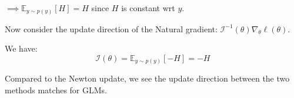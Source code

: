 \begin{solution}
\begin{itemize}
              $\implies \mathbb{E}_{y \sim p(y)}[H] = H$ since $H$ is constant wrt $y$.

              Now consider the update direction of the Natural gradient: $\mathcal{I}^{-1}(\theta) \nabla_\theta \ell(\theta)$.

              We have:
              \[
                  \mathcal{I}(\theta) = \mathbb{E}_{y \sim p(y)}[-H] = -H
              \]

              Compared to the Newton update, we see the update direction between the two methods matches for GLMs.
    \end{itemize}

\end{solution}